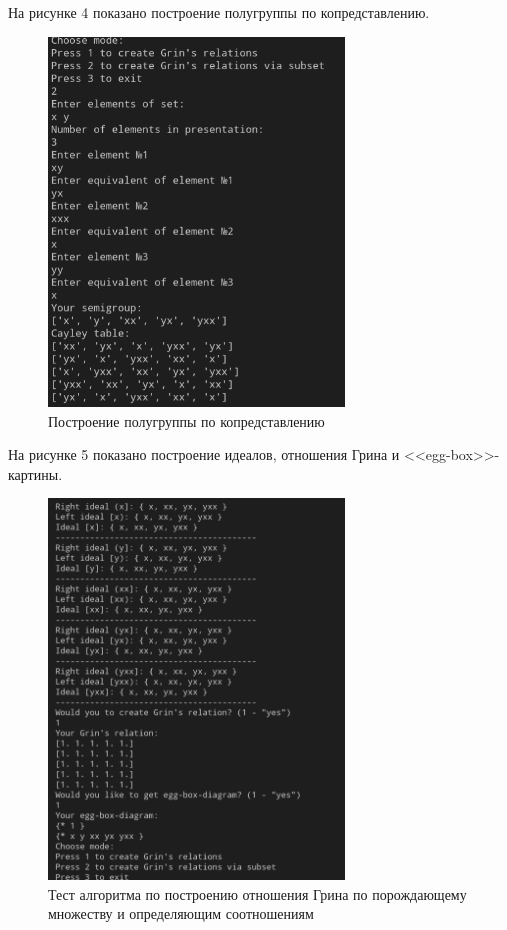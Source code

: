 \documentclass[bachelor, och, labwork]{shiza}
\begin{document}
 
      На рисунке 4 показано построение полугруппы по копредставлению.

      \begin{figure}[H]
        \centering
        \includegraphics[width=0.7\textwidth]{photo/4.png}
        \caption{Построение полугруппы по копредставлению}
      \end{figure}

      На рисунке 5 показано построение идеалов, отношения Грина и <<egg-box>>-картины.


      \begin{figure}[H]
        \centering
        \includegraphics[width=0.7\textwidth]{photo/5.png}
        \caption{Тест алгоритма по построению отношения Грина по порождающему множеству и определяющим соотношениям}
      \end{figure}
\end{document}
